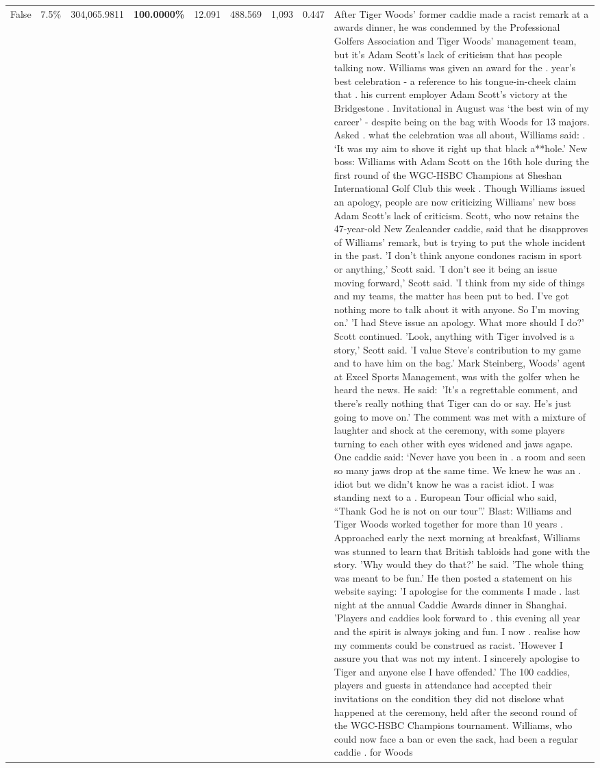\begin{table}[H]
\begin{tabular}{lllrlllll}
False & 7.5\% & \color{red} 304,065.9811 & \bfseries \color{red} 100.0000\% & 12.091 & 488.569 & 1,093 & 0.447 & After Tiger Woods' former caddie made a racist remark at a awards dinner, he was condemned by the Professional Golfers Association and Tiger Woods' management team, but it's Adam Scott's lack of criticism that has people talking now. Williams was given an award for the . year’s best celebration - a reference to his tongue-in-cheek claim that . his current employer Adam Scott’s victory at the Bridgestone . Invitational in August was ‘the best win of my career’ - despite being on the bag with Woods for 13 majors. Asked . what the celebration was all about, Williams said: . ‘It was my aim to shove it right up that black a**hole.’ New boss: Williams with Adam Scott  on the 16th hole during the first round of the WGC-HSBC Champions at Sheshan International Golf Club this week . Though Williams issued an apology, people are now criticizing Williams' new boss Adam Scott's lack of criticism. Scott, who now retains the 47-year-old New Zealeander caddie, said that he disapproves of Williams' remark, but is trying to put the whole incident in the past. 'I don't think anyone condones racism in sport or anything,' Scott said. 'I don't see it being an issue moving forward,' Scott said. 'I think from my side of things and my teams, the matter has been put to bed. I've got nothing more to talk about it with anyone. So I'm moving on.' 'I had Steve issue an apology. What more should I do?' Scott continued. 'Look, anything with Tiger involved is a story,' Scott said. 'I value Steve's contribution to my game and to have him on the bag.' Mark Steinberg, Woods' agent at Excel Sports Management, was with the golfer when he heard the news. He said: 'It's a regrettable comment, and there's really nothing that Tiger can do or say. He's just going to move on.' The comment was met with a mixture of laughter and shock at the ceremony, with some players turning to each other with eyes widened and jaws agape. One caddie said: ‘Never have you been in . a room and seen so many jaws drop at the same time. We knew he was an . idiot but we didn’t know he was a racist idiot. I was standing next to a . European Tour official who said, “Thank God he is not on our tour”.’ Blast: Williams and Tiger Woods worked together for more than 10 years . Approached early the next morning at breakfast, Williams was stunned to learn that British tabloids had gone with the story. 'Why would they do that?' he said. 'The whole thing was meant to be fun.' He then posted a statement on his website saying: 'I apologise for the comments I made . last night at the annual Caddie Awards dinner in Shanghai. 'Players and caddies look forward to . this evening all year and the spirit is always joking and fun. I now . realise how my comments could be construed as racist. 'However I assure you that was not my intent. I sincerely apologise to Tiger and anyone else I have offended.' The 100 caddies, players and guests in attendance had accepted their invitations on the condition they did not disclose what happened at the ceremony, held after the second round of the WGC-HSBC Champions tournament. Williams, who could now face a ban or even the sack, had been a regular caddie . for Woods 
\end{tabular}
\end{table}
